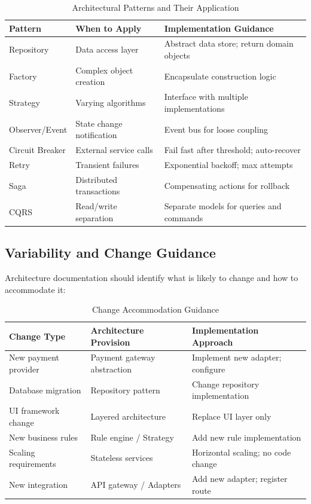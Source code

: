 \documentclass[11pt]{article}
\begin{document}
\begin{longtable}{@{}L{3cm} L{4cm} L{5.5cm}@{}}
\caption{Architectural Patterns and Their Application} \\
\toprule
\textbf{Pattern} & \textbf{When to Apply} & \textbf{Implementation Guidance} \\
\midrule
\endfirsthead
\bottomrule
\endlastfoot
Repository & Data access layer & Abstract data store; return domain objects \\
Factory & Complex object creation & Encapsulate construction logic \\
Strategy & Varying algorithms & Interface with multiple implementations \\
Observer/Event & State change notification & Event bus for loose coupling \\
Circuit Breaker & External service calls & Fail fast after threshold; auto-recover \\
Retry & Transient failures & Exponential backoff; max attempts \\
Saga & Distributed transactions & Compensating actions for rollback \\
CQRS & Read/write separation & Separate models for queries and commands \\
\end{longtable}

\subsection{Variability and Change Guidance}

Architecture documentation should identify what is likely to change and how to accommodate it:

\begin{longtable}{@{}L{3cm} L{4cm} L{5.5cm}@{}}
\caption{Change Accommodation Guidance} \\
\toprule
\textbf{Change Type} & \textbf{Architecture Provision} & \textbf{Implementation Approach} \\
\midrule
\endfirsthead
\bottomrule
\endlastfoot
New payment provider & Payment gateway abstraction & Implement new adapter; configure \\
Database migration & Repository pattern & Change repository implementation \\
UI framework change & Layered architecture & Replace UI layer only \\
New business rules & Rule engine / Strategy & Add new rule implementation \\
Scaling requirements & Stateless services & Horizontal scaling; no code change \\
New integration & API gateway / Adapters & Add new adapter; register route \\
\end{longtable}
\end{document}
